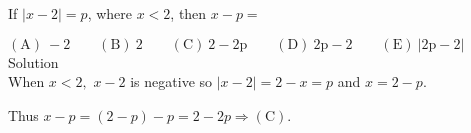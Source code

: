 
If $|x - 2| = p$, where $x < 2$, then $x - p =$

$\mathrm{(A) \ -2 } \qquad \mathrm{(B) \ 2 } \qquad \mathrm{(C) \ 2-2p } \qquad \mathrm{(D) \ 2p-2 } \qquad \mathrm{(E) \ |2p-2| }$
\\
Solution
\\
When $x < 2,$ $x-2$ is negative so $|x - 2| = 2-x = p$ and $x = 2-p$.

Thus $x-p = (2-p)-p = 2-2p \Longrightarrow \mathrm{(C)}$.
